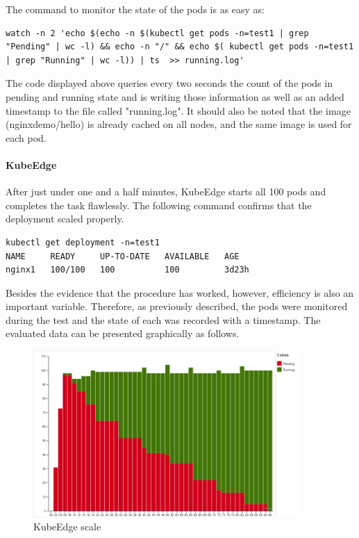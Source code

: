\documentclass[MSC,Master,english]{twbook}%
\begin{document}
The command to monitor the state of the pods is as easy as:
\vspace{\baselineskip}
\begin{lstlisting}[caption={Pods status},captionpos=b]
watch -n 2 'echo $(echo -n $(kubectl get pods -n=test1 | grep "Pending" | wc -l) && echo -n "/" && echo $( kubectl get pods -n=test1 | grep "Running" | wc -l)) | ts  >> running.log'
\end{lstlisting}
\vspace{\baselineskip}
The code displayed above queries every two seconds the count of the pods in pending and running state and is writing those information as well as an added timestamp to the file called "running.log". It should also be noted that the image (nginxdemo/hello) is already cached on all nodes, and the same image is used for each pod.

\paragraph{KubeEdge} After just under one and a half minutes, KubeEdge starts all 100 pods and completes the task flawlessly. The following command confirms that the deployment scaled properly.
\vspace{\baselineskip}

\begin{lstlisting}[caption={KubeEdge scaling to 100},captionpos=b]
kubectl get deployment -n=test1
NAME     READY     UP-TO-DATE   AVAILABLE   AGE
nginx1   100/100   100          100         3d23h
\end{lstlisting}

Besides the evidence that the procedure has worked, however, efficiency is also an important variable. Therefore, as previously described, the pods were monitored during the test and the state of each was recorded with a timestamp. The evaluated data can be presented graphically as follows.

\begin{center}
\begin{figure}[ht]
    \centering
    \includegraphics[width=0.9\textwidth]{PICs/kubeedge-scale-100.png}
    \caption{KubeEdge scale}
    \label{fig:kubeedge-scale}
\end{figure}
\end{center}
\end{document}

